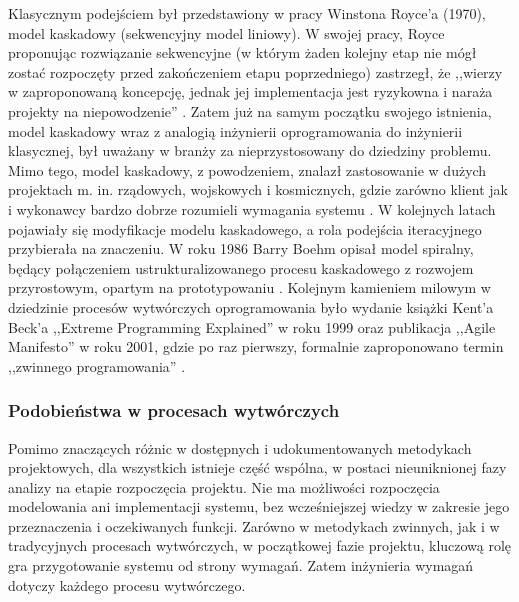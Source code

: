         Klasycznym podejściem był przedstawiony w pracy Winstona Royce'a (1970), model kaskadowy (sekwencyjny model liniowy)\footnotemark.  W swojej pracy, Royce proponując rozwiązanie sekwencyjne (w którym żaden kolejny etap nie mógł zostać rozpoczęty przed zakończeniem etapu poprzedniego) zastrzegł, że ,,wierzy w zaproponowaną koncepcję, jednak jej implementacja jest ryzykowna i naraża projekty na niepowodzenie'' \cite{RWins70}. Zatem już na samym początku swojego istnienia, model kaskadowy wraz z analogią inżynierii oprogramowania do inżynierii klasycznej, był uważany w branży za nieprzystosowany do dziedziny problemu. Mimo tego, model kaskadowy, z powodzeniem, znalazł zastosowanie w dużych projektach m. in. rządowych, wojskowych i kosmicznych, gdzie zarówno klient jak i wykonawcy bardzo dobrze rozumieli wymagania systemu \cite{NasaSE}. W kolejnych latach pojawiały się modyfikacje modelu kaskadowego, a rola podejścia iteracyjnego przybierała na znaczeniu. W roku 1986 Barry Boehm opisał model spiralny, będący połączeniem ustrukturalizowanego procesu kaskadowego z rozwojem przyrostowym, opartym na prototypowaniu \cite{Boehm86}. Kolejnym kamieniem milowym w dziedzinie procesów wytwórczych oprogramowania było wydanie książki Kent'a Beck'a ,,Extreme Programming Explained'' \cite{KBeck00} w roku 1999 oraz publikacja ,,Agile Manifesto'' w roku 2001, gdzie po raz pierwszy, formalnie zaproponowano termin ,,zwinnego programowania'' \cite{MFowl01}. 
      
      \subsubsection{Podobieństwa w procesach wytwórczych}

        Pomimo znaczących różnic w dostępnych i udokumentowanych metodykach projektowych, dla wszystkich istnieje część wspólna, w postaci nieuniknionej fazy analizy na etapie rozpoczęcia projektu. Nie ma możliwości rozpoczęcia modelowania ani implementacji systemu, bez wcześniejszej wiedzy w zakresie jego przeznaczenia i oczekiwanych funkcji. Zarówno w metodykach zwinnych, jak i w tradycyjnych procesach wytwórczych, w początkowej fazie projektu, kluczową rolę gra przygotowanie systemu od strony wymagań. Zatem inżynieria wymagań dotyczy każdego procesu wytwórczego.

